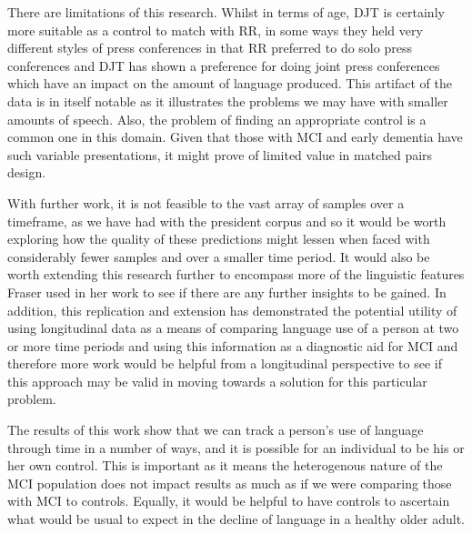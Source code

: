 \documentclass[10pt]{article}
\begin{document}
There are limitations of this research. Whilst in terms of age, DJT is certainly more suitable as a control to match with RR, in some ways they held very different styles of press conferences in that RR preferred to do solo press conferences and DJT has shown a preference for doing joint press conferences which have an impact on the amount of language produced. This artifact of the data is in itself notable as it illustrates the problems we may have with smaller amounts of speech. Also, the problem of finding an appropriate control is a common one in this domain. Given that those with MCI and early dementia have such variable presentations, it might prove of limited value in matched pairs design. 
\par 
With further work, it is not feasible to the vast array of samples over a timeframe, as we have had with the president corpus and so it would be worth exploring how the quality of these predictions might lessen when faced with considerably fewer samples and over a smaller time period. It would also be worth extending this research further to encompass more of the linguistic features Fraser used in her work \cite{Fraser2015} to see if there are any further insights to be gained. In addition, this replication and extension has demonstrated the potential utility of using longitudinal data as a means of comparing language use of a person at two or more time periods and using this information as a diagnostic aid for MCI and therefore more work would be helpful from a longitudinal perspective to see if this approach may be valid in moving towards a solution for this particular problem. 
\par 
The results of this work show that we can track a person's use of language through time in a number of ways, and it is possible for an individual to be his or her own control. This is important as it means the heterogenous nature of the MCI population does not impact results as much as if we were comparing those with MCI to controls. Equally, it would be helpful to have controls to ascertain what would be usual to expect in the decline of language in a healthy older adult. 
\end{document}

